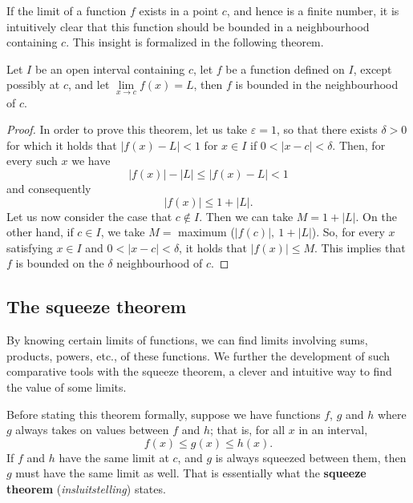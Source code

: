 \ifcourse
\ifanalysis

If the limit of a function $f$ exists in a point $c$, and hence is a finite number, it is intuitively clear that this function should be bounded in a neighbourhood containing $c$. This insight is formalized in the following theorem. 

\begin{theorem}
\label{thm_lim_bound}
Let $I$ be an open interval containing $c$, let $f$ be a function defined on $I$, except possibly at $c$, and let $\lim\limits_{x \rightarrow c} f(x) = L$, then $f$ is bounded in the neighbourhood of $c$.  
\end{theorem}

\begin{proof}
In order to prove this theorem, let us take  $\varepsilon = 1$, so that there exists $\delta > 0$ for which it holds that $\left|f(x)-L\right| < 1$ for $x \in I$ if $0 < \left|x-c\right| < \delta$. Then, for every such $x$ we have
$$
\left|f(x)\right| - \left|L\right| \leq \left|f(x)-L\right| < 1
$$
and consequently
$$
\left|f(x)\right| \leq 1 + \left|L\right|.
$$
Let us now consider the case that $c \notin I$. Then we can take $M = 1 + |L|$. On the other hand, if $c \in I$, we take $M =$ maximum ($\left|f(c)\right|, ~1 + |L|$). So, for every $x$ satisfying $x \in I$ and $0 < |x-c| < \delta$, it holds that $\left|f(x)\right| \leq M$. This implies that $f$ is bounded on the $\delta$ neighbourhood of $c$.
\end{proof}

\fi


\subsection{The squeeze theorem}
By knowing certain limits of functions, we can find limits involving sums, products, powers, etc., of these functions. We further the development of such comparative tools with the squeeze theorem, a clever and intuitive way to find the value of some limits. 

Before stating this theorem formally, suppose we have functions $f$, $g$ and $h$ where $g$ always takes on values between $f$ and $h$; that is, for all $x$ in an interval, $$f(x) \leq g(x) \leq h(x).$$ If $f$ and $h$ have the same limit at $c$, and $g$  is always squeezed between them, then $g$ must have the same limit as well. That is essentially what the \textbf{squeeze theorem} (\textit{insluitstelling}) states.



